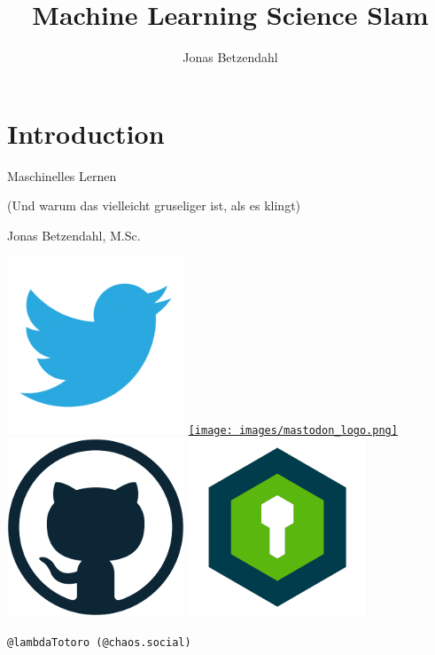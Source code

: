 \documentclass[aspectratio=43,x11names]{beamer}
\author{Jonas Betzendahl}
\title{Machine Learning Science Slam}
\begin{document}
\section{Introduction}

\begin{frame}
\begin{center}
\vfill
\huge Maschinelles Lernen
\normalsize 

(Und warum das vielleicht gruseliger ist, als es klingt)
\bigskip\bigskip

\large Jonas Betzendahl, M.Sc.
\bigskip\bigskip

\href{https://twitter.com/lambdatotoro}{\includegraphics[scale=0.125]{images/twitter_logo.png}}
\href{https://chaos.social/@lambdatotoro}{\texttt{[image: images/mastodon\_logo.png]}}
\href{https://github.com/jbetzend}{\includegraphics[scale=0.125]{images/github_logo.png}}
\href{https://whispeer.de/en/user/jbetzend}{\includegraphics[scale=0.125]{images/whispeer_logo.png}}

\texttt{@lambdaTotoro (@chaos.social)}
\end{center}
\end{frame}
\end{document}
